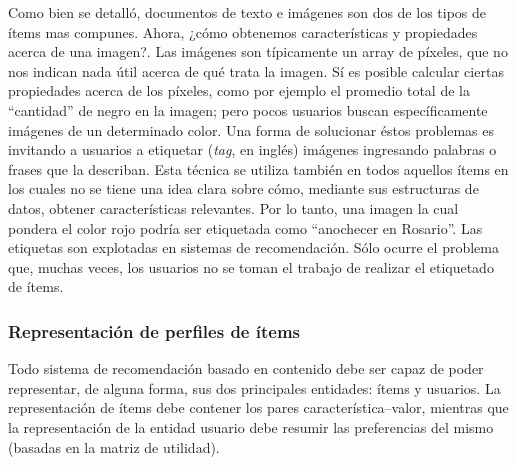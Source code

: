 			Como bien se detalló, documentos de texto e imágenes son dos de los tipos de ítems mas compunes. Ahora, ¿cómo obtenemos características y propiedades acerca de una imagen?. Las imágenes son típicamente un array de píxeles, que no nos indican nada útil acerca de qué trata la imagen. Sí es posible calcular ciertas propiedades acerca de los píxeles, como por ejemplo el promedio total de la \enquote{cantidad} de negro en la imagen; pero pocos usuarios buscan específicamente imágenes de un determinado color. Una forma de solucionar éstos problemas es invitando a usuarios a etiquetar (\textit{tag}, en inglés) imágenes ingresando palabras o frases que la describan. Esta técnica se utiliza también en todos aquellos ítems en los cuales no se tiene una idea clara sobre cómo, mediante sus estructuras de datos, obtener características relevantes. Por lo tanto, una imagen la cual pondera el color rojo podría ser etiquetada como \enquote{anochecer en Rosario}. Las etiquetas son explotadas en sistemas de recomendación. Sólo ocurre el problema que, muchas veces, los usuarios no se toman el trabajo de realizar el etiquetado de ítems.
			
			\subsubsection{Representación de perfiles de ítems}
				Todo sistema de recomendación basado en contenido debe ser capaz de poder representar, de alguna forma, sus dos principales entidades: ítems y usuarios. La representación de ítems debe contener los pares característica--valor, mientras que la representación de la entidad usuario debe resumir las preferencias del mismo (basadas en la matriz de utilidad). \par
				

